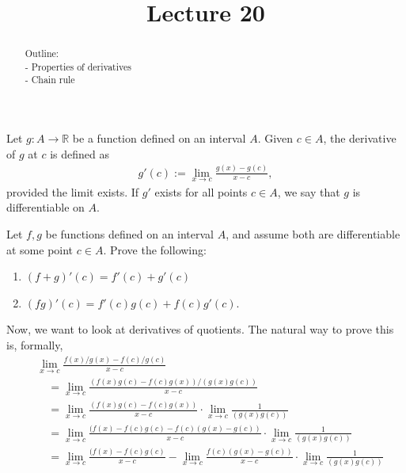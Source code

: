 \documentclass{ximera}
\begin{document}
    \title{Lecture 20}
    
    \begin{abstract}  
    Outline: \\
    - Properties of derivatives \\
    - Chain rule
\end{abstract}

\maketitle

\begin{definition}
    Let $g:A \to \mathbb{R}$ be a function defined on an interval $A$.  Given $c \in A$, the derivative of $g$ at $c$ is defined as
    \begin{align*}
        g'(c) := \lim\limits_{x\to c} \frac{g(x) - g(c)}{x-c},
    \end{align*}
    provided the limit exists.  If $g'$ exists for all points $c \in A$, we say that $g$ is differentiable on $A$.
\end{definition}

\begin{exercise}
    Let $f,g$ be functions defined on an interval $A$, and assume both are differentiable at some point $c \in A$.  Prove the following:
    \begin{enumerate}
        \item $(f+g)'(c) = f'(c) + g'(c)$
        \item $(fg)'(c) = f'(c)g(c) + f(c) g'(c).$
    \end{enumerate}
\end{exercise}

Now, we want to look at derivatives of quotients.  The natural way to prove this is, formally,
\begin{align*}
    &\lim\limits_{x\to c} \frac{f(x)/g(x) - f(c)/g(c)}{x-c}
    \\
    &\quad =
    \lim\limits_{x\to c} \frac{(f(x)g(c) - f(c)g(x))/(g(x)g(c))}{x-c}
    \\
    &\quad = 
    \lim\limits_{x\to c} \frac{(f(x)g(c) - f(c)g(x))}{x-c} \cdot \lim\limits_{x\to c} \frac{1}{(g(x)g(c))}
    \\
    &\quad =
    \lim\limits_{x\to c} \frac{(f(x)-f(c)g(c) - f(c)(g(x)-g(c))}{x-c} \cdot \lim\limits_{x\to c} \frac{1}{(g(x)g(c))}
    \\
    &\quad =
    \lim\limits_{x\to c} \frac{(f(x)-f(c)g(c)}{x-c} - \lim\limits_{x\to c} \frac{f(c)(g(x)-g(c))}{x-c} \cdot \lim\limits_{x\to c} \frac{1}{(g(x)g(c))}
\end{align*}
\end{document}
